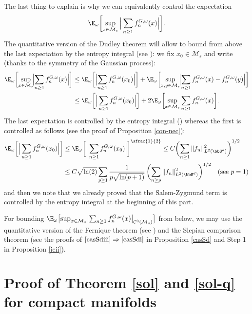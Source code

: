 The last thing to explain is why we can equivalently control the expectation
\begin{equation*}
\E_{\omega}\biggl[\sup_{x\in \mathcal{M}_s}\Big\vert\sum_{n\geq 1} f_n^{G,\omega}(x)\Big\vert \biggr].
\end{equation*}
The quantitative version of the Dudley theorem will allow to bound from above the last expectation by the entropy integral (see \cite[Th.\,11.17]{ledoux}): we fix $x_0\in \mathcal{M}_s$ and write (thanks to the symmetry of the Gaussian process):
\begin{align*}
\E_{\omega}\biggl[\sup_{x\in \mathcal{M}_s}\!\Bigl\vert\sum_{n\geq 1} f_n^{G,\omega}(x)\Bigr\vert \biggr]&\leq
\E_{\omega}\biggl[\Bigl\vert\sum_{n\geq 1} f_n^{G,\omega}(x_0)\Bigr\vert \biggr]+
\E_{\omega}\biggl[\sup_{x,y\in \mathcal{M}_s}\!\Bigl\vert\sum_{n\geq 1} f_n^{G,\omega}(x)-f_n^{G,\omega}(y)\Bigr\vert \biggr] \\
&\leq
\E_{\omega}\biggl[\Big\vert\sum_{n\geq 1} f_n^{G,\omega}(x_0)\Big\vert \biggr]+2
\E_{\omega}\biggl[\sup_{x\in \mathcal{M}_s}\sum_{n\geq 1} f_n^{G,\omega}(x) \biggr].
\end{align*}
The last expectation is controlled by the entropy integral (\cite[Th.\,11.17]{ledoux}) whereas the first is controlled as follows (see the proof of Proposition \ref{con-nec}):
\begin{align*}
\E_{\omega}\biggl[\Big\vert\sum_{n\geq 1} f_n^{G,\omega}(x_0)\Big\vert \biggr] & \leq \E_{\omega}\biggl[\Big\vert\sum_{n\geq 1} f_n^{G,\omega}(x_0)\Big\vert \biggr]^{\sfrac{1}{2}} \leq C \biggl(\sum_{n\geq 1} \|f_n\|_{L^2(\bbS^d)}^2 \biggr)^{1/2} \\
& \leq C\sqrt{\ln(2)}\sum_{p\geq 1} \frac{1}{p\sqrt{\ln(p+1)}}\, \biggl(\sum_{n\geq p} \|f_n\|_{L^2(\bbS^d)}^2 \biggr)^{1/2} \quad \text{(see $p=1$)}
\end{align*}
and then we note that we already proved that the Salem-Zygmund term is controlled by the entropy integral at the beginning of this part.

For bounding $\E_{\omega}\bigl[\sup_{x\in \mathcal{M}_s}\bigl\vert\sum_{n\geq 1} f_n^{G,\omega}(x)\bigr\vert_{\mathcal{C}^{0}(\mathcal{M}_s)} \bigr]$ from below, we may use the quantitative version of the Fernique theorem (see \cite[Th.\,13.3]{ledoux}) and the Slepian comparison theorem (see the proofs of $\eqref{casSdiii}\Rightarrow\eqref{casSdi}$ in Proposition \ref{casSd} and Step 1 in Proposition \ref{ieii}).

\section{Proof of Theorem \ref{sol} and \ref{sol-q} for compact manifolds}\label{preuv-solM}

